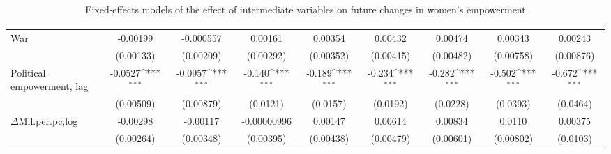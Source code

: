 \begin{table}[htbp]\centering
\def\sym#1{\ifmmode^{#1}\else\(^{#1}\)\fi}
\caption{Fixed-effects models of the effect of intermediate variables on future changes in women's empowerment\label{intermpolempowerment}}
\begin{tabular}{l*{8}{c}}
\hline\hline
                    &&&&&&&&\\
\hline
War            &    -0.00199         &   -0.000557         &     0.00161         &     0.00354         &     0.00432         &     0.00474         &     0.00343         &     0.00243         \\
                    &   (0.00133)         &   (0.00209)         &   (0.00292)         &   (0.00352)         &   (0.00415)         &   (0.00482)         &   (0.00758)         &   (0.00876)         \\
[1em]
Political empowerment, lag    &     -0.0527\sym{***}&     -0.0957\sym{***}&      -0.140\sym{***}&      -0.189\sym{***}&      -0.234\sym{***}&      -0.282\sym{***}&      -0.502\sym{***}&      -0.672\sym{***}\\
                    &   (0.00509)         &   (0.00879)         &    (0.0121)         &    (0.0157)         &    (0.0192)         &    (0.0228)         &    (0.0393)         &    (0.0464)         \\
[1em]
$\Delta$Mil.per.pc,log      &    -0.00298         &    -0.00117         & -0.00000996         &     0.00147         &     0.00614         &     0.00834         &      0.0110         &     0.00375         \\
                    &   (0.00264)         &   (0.00348)         &   (0.00395)         &   (0.00438)         &   (0.00479)         &   (0.00601)         &   (0.00802)         &    (0.0103)         \\

\end{tabular}
\end{table}

